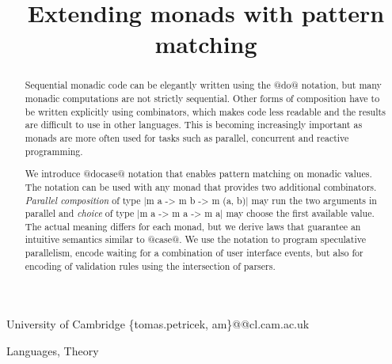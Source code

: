 \documentclass[preprint]{sigplanconf}
\begin{document}
\copyrightdata{[to be supplied]} 


\title{Extending monads with pattern matching}

           {University of Cambridge}
           {\{tomas.petricek, am\}@@cl.cam.ac.uk}

\maketitle

\begin{abstract}
Sequential monadic code can be elegantly written using the @do@ notation, but many monadic 
computations are not strictly sequential. Other forms of composition have to be written explicitly 
using combinators, which makes code less readable and the results are difficult to use in other 
languages. This is becoming increasingly important as monads are more often used for tasks such as 
parallel, concurrent and reactive programming.

We introduce @docase@ notation that enables pattern matching on monadic values. The notation can 
be used with any monad that provides two additional combinators. \textit{Parallel composition} of 
type |m a -> m b -> m (a, b)| may run the two arguments in parallel and \textit{choice} of type 
|m a -> m a -> m a| may choose the first available value. The actual meaning differs for each monad, 
but we derive laws that guarantee an intuitive semantics similar to @case@. We use the notation 
to program speculative parallelism, encode waiting for a combination of user interface events, but 
also for encoding of validation rules using the intersection of parsers. 
\end{abstract}


\terms
Languages, Theory

\end{document}
